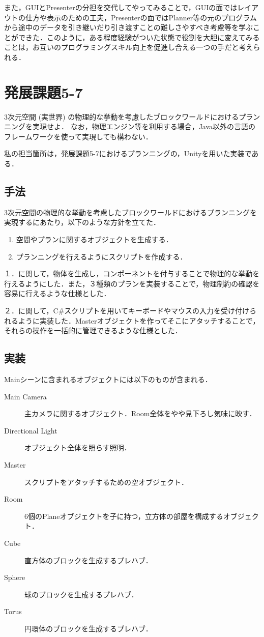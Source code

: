 \documentclass[12pt]{jarticle}
\begin{document}
また，GUIとPresenterの分担を交代してやってみることで，GUIの面ではレイアウトの仕方や表示のための工夫，Presenterの面ではPlanner等の元のプログラムから途中のデータを引き継いだり引き渡すことの難しさやすべき考慮等を学ぶことができた．このように，ある程度経験がついた状態で役割を大胆に変えてみることは，お互いのプログラミングスキル向上を促進し合える一つの手だと考えられる．

\section{発展課題5-7}
\begin{screen}
3次元空間 (実世界) の物理的な挙動を考慮したブロックワールドにおけるプランニングを実現せよ．
なお，物理エンジン等を利用する場合，Java以外の言語のフレームワークを使って実現しても構わない．
\end{screen}
私の担当箇所は，発展課題5-7におけるプランニングの，Unityを用いた実装である．

\subsection{手法}
3次元空間の物理的な挙動を考慮したブロックワールドにおけるプランニングを実現するにあたり，以下のような方針を立てた．
\begin{enumerate}
\item 空間やプランに関するオブジェクトを生成する．
\item プランニングを行えるようにスクリプトを作成する．
\end{enumerate}

１．に関して，物体を生成し，コンポーネントを付与することで物理的な挙動を行えるようにした．また，３種類のプランを実装することで，物理制約の確認を容易に行えるような仕様とした．

２．に関して，C\#スクリプトを用いてキーボードやマウスの入力を受け付けられるように実装した．Masterオブジェクトを作ってそこにアタッチすることで，それらの操作を一括的に管理できるような仕様とした．

\subsection{実装}
Mainシーンに含まれるオブジェクトには以下のものが含まれる．
\begin{description}
\item[Main Camera] 主カメラに関するオブジェクト．Room全体をやや見下ろし気味に映す．
\item[Directional Light] オブジェクト全体を照らす照明．
\item[Master] スクリプトをアタッチするための空オブジェクト．
\item[Room] 6個のPlaneオブジェクトを子に持つ，立方体の部屋を構成するオブジェクト．
\item[Cube] 直方体のブロックを生成するプレハブ．
\item[Sphere] 球のブロックを生成するプレハブ．
\item[Torus] 円環体のブロックを生成するプレハブ．
\end{description} 
\end{document}
